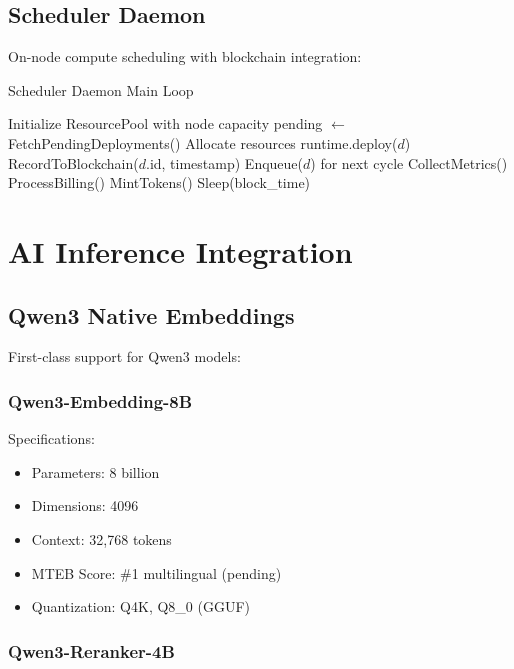 \documentclass[11pt,twocolumn]{article}
\begin{document}
\subsection{Scheduler Daemon}

On-node compute scheduling with blockchain integration:

\begin{algorithm}
\caption{Scheduler Daemon Main Loop}
\begin{algorithmic}[1]
\STATE Initialize ResourcePool with node capacity
\LOOP
    \STATE pending $\leftarrow$ FetchPendingDeployments()
            \STATE Allocate resources
            \STATE runtime.deploy($d$)
            \STATE RecordToBlockchain($d$.id, timestamp)
        \ELSE
            \STATE Enqueue($d$) for next cycle
        \ENDIF
    \ENDFOR
    \STATE CollectMetrics()
        \STATE ProcessBilling()
        \STATE MintTokens()
    \ENDIF
    \STATE Sleep(block\_time)
\ENDLOOP
\end{algorithmic}
\end{algorithm}

\section{AI Inference Integration}

\subsection{Qwen3 Native Embeddings}

First-class support for Qwen3 models:

\subsubsection{Qwen3-Embedding-8B}

Specifications:
\begin{itemize}
\item Parameters: 8 billion
\item Dimensions: 4096
\item Context: 32,768 tokens
\item MTEB Score: \#1 multilingual (pending)
\item Quantization: Q4K, Q8\_0 (GGUF)
\end{itemize}

\subsubsection{Qwen3-Reranker-4B}
\end{document}

